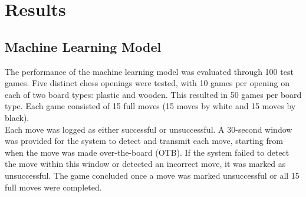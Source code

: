 \chapter{Results}

\section{Machine Learning Model}

The performance of the machine learning model was evaluated through 100 test games. Five distinct chess openings were tested, with 10 games per opening on each of two board types: plastic and wooden. This resulted in 50 games per board type. Each game consisted of 15 full moves (15 moves by white and 15 moves by black). \\

Each move was logged as either successful or unsuccessful. A 30-second window was provided for the system to detect and transmit each move, starting from when the move was made over-the-board (OTB). If the system failed to detect the move within this window or detected an incorrect move, it was marked as unsuccessful. The game concluded once a move was marked unsuccessful or all 15 full moves were completed.

\newpage

